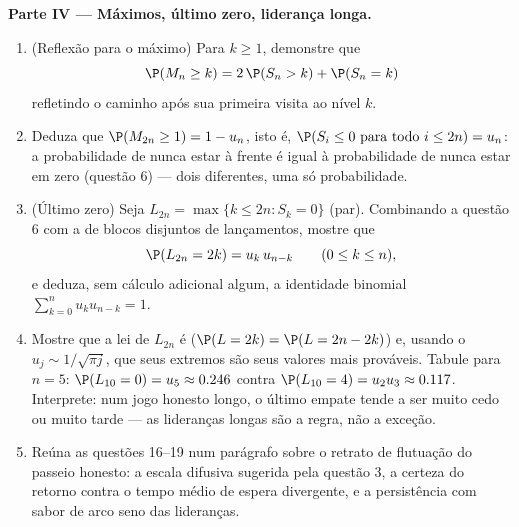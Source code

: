 \begin{problem}
\medskip
\noindent\textbf{Parte IV --- Máximos, último zero, liderança longa.}
\begin{enumerate}[resume]
  \item (Reflexão para o máximo) Para $k \geq 1$, demonstre que
        \[
        \P(M_n \geq k) = 2\,\P(S_n > k) + \P(S_n = k)
        \]
        refletindo o caminho após sua primeira visita ao
        nível $k$.
  \item Deduza que $\P(M_{2n} \geq 1) = 1 - u_n$, isto é,
        $\P(S_i \leq 0 \text{ para todo } i \leq 2n) = u_n$:
        a probabilidade de nunca estar à frente é igual à
        probabilidade de nunca estar em zero (questão 6) ---
        dois  diferentes, uma só probabilidade.
  \item (Último zero) Seja $L_{2n} = \max\{k \leq 2n : S_k =
        0\}$ (par). Combinando a questão 6 com a 
        de blocos disjuntos de lançamentos, mostre que
        \[
        \P(L_{2n} = 2k) = u_k\,u_{n-k}
        \qquad (0 \leq k \leq n),
        \]
        e deduza, sem cálculo adicional algum, a identidade
        binomial $\sum_{k=0}^n u_ku_{n-k} = 1$.
  \item Mostre que a lei de $L_{2n}$ é  ($\P(L =
        2k) = \P(L = 2n - 2k)$) e, usando o $u_j \sim
        1/\sqrt{\pi j}$, que seus extremos são seus valores
        mais prováveis. Tabule para $n = 5$: $\P(L_{10} = 0)
        = u_5 \approx 0.246$ contra $\P(L_{10} = 4) = u_2u_3
        \approx 0.117$. Interprete: num jogo honesto longo, o
        último empate tende a ser muito cedo ou muito tarde ---
        as lideranças longas são a regra, não a exceção.
  \item Reúna as questões 16--19 num parágrafo sobre o
        retrato de flutuação do passeio honesto: a escala
        difusiva sugerida pela questão 3, a certeza do
        retorno contra o tempo médio de espera divergente, e
        a persistência com sabor de arco seno das lideranças.
\end{enumerate}


\end{problem}
